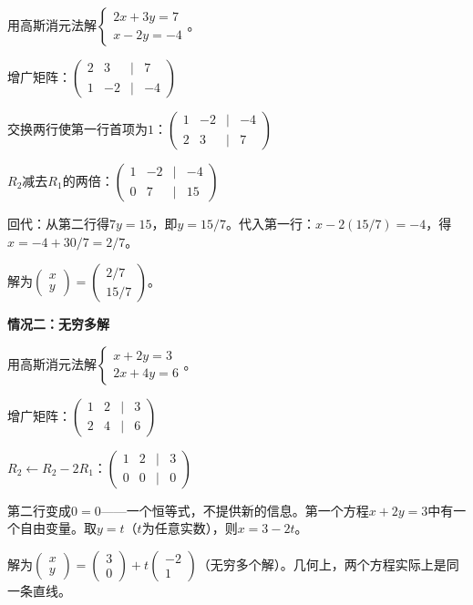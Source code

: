 \begin{example}
用高斯消元法解$\begin{cases}2x+3y=7\\x-2y=-4\end{cases}$。
\end{example}
\begin{solution}
增广矩阵：$\begin{pmatrix}2 & 3 & | & 7\\1 & -2 & | & -4\end{pmatrix}$

交换两行使第一行首项为$1$：$\begin{pmatrix}1 & -2 & | & -4\\2 & 3 & | & 7\end{pmatrix}$

$R_2$减去$R_1$的两倍：$\begin{pmatrix}1 & -2 & | & -4\\0 & 7 & | & 15\end{pmatrix}$

回代：从第二行得$7y=15$，即$y=15/7$。代入第一行：$x-2(15/7)=-4$，得$x=-4+30/7=2/7$。

解为$\begin{pmatrix}x\\y\end{pmatrix}=\begin{pmatrix}2/7\\15/7\end{pmatrix}$。
\end{solution}

\vspace{0.2cm}
\noindent\textbf{情况二：无穷多解}

\begin{example}
用高斯消元法解$\begin{cases}x+2y=3\\2x+4y=6\end{cases}$。
\end{example}
\begin{solution}
增广矩阵：$\begin{pmatrix}1 & 2 & | & 3\\2 & 4 & | & 6\end{pmatrix}$

$R_2\leftarrow R_2-2R_1$：$\begin{pmatrix}1 & 2 & | & 3\\0 & 0 & | & 0\end{pmatrix}$

第二行变成$0=0$——一个恒等式，不提供新的信息。第一个方程$x+2y=3$中有一个自由变量。取$y=t$（$t$为任意实数），则$x=3-2t$。

解为$\begin{pmatrix}x\\y\end{pmatrix}=\begin{pmatrix}3\\0\end{pmatrix}+t\begin{pmatrix}-2\\1\end{pmatrix}$（无穷多个解）。几何上，两个方程实际上是同一条直线。
\end{solution}


